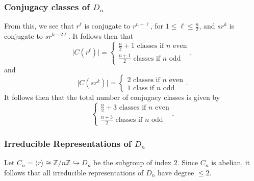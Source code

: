 \documentclass[a4paper]{report}
\theoremstyle{definition}
\theoremstyle{remark}
\theoremstyle{proposition}
\theoremstyle{conjecture}
\theoremstyle{lemma}
\theoremstyle{corollary}
\theoremstyle{exercise}
\theoremstyle{example}
\begin{document}
\subsubsection{Conjugacy classes of $D_n$}
From this, we see that $r^\ell$ is conjugate to $r^{n-\ell}$, for 
$1\leq \ell \leq \frac{n}{2}$, and $sr^k$ is conjugate to 
$sr^{k-2\ell}$. It follows then that 
$$\vert C(r^\ell)\vert = \begin{cases}
    \text{$\frac{n}{2}+1$ classes if $n$ even}\\
    \text{$\frac{n+1}{2}$ classes if $n$ odd}
\end{cases},$$
and $$\vert C(sr^k) \vert  = \begin{cases}
    \text{$2$ classes if $n$ even}\\
    \text{$1$ class if $n$ odd}
\end{cases}.$$
It follows then that the total number of conjugacy classes is given by 
$$\begin{cases}
    \text{$\frac{n}{2}+3$ classes if $n$ even}\\
    \text{$\frac{n+3}{2}$ classes if $n$ odd}
\end{cases}.$$
\subsubsection{Irreducible Representations of $D_n$}
Let $C_n = \langle r\rangle \cong \mathbb{Z}/n\mathbb{Z} \hookrightarrow D_n$ 
be the subgroup of index $2$. Since $C_n$ is abelian, it follows that 
all irreducible representations of $D_n$ have degree $\leq 2$.
\end{document}

